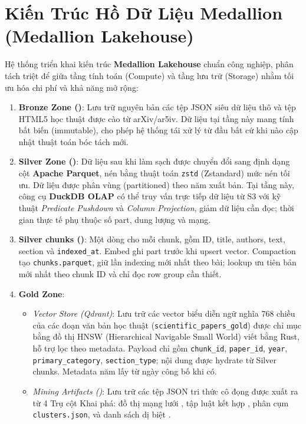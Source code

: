 \section{Kiến Trúc Hồ Dữ Liệu Medallion (Medallion Lakehouse)}

Hệ thống triển khai kiến trúc \textbf{Medallion Lakehouse} chuẩn công nghiệp, phân tách triệt để giữa tầng tính toán (Compute) và tầng lưu trữ (Storage) nhằm tối ưu hóa chi phí và khả năng mở rộng:

\begin{enumerate}[label=\textbf{\arabic*.}]
  \item \textbf{Bronze Zone ()}:
    Lưu trữ nguyên bản các tệp JSON siêu dữ liệu thô và tệp HTML5 học thuật được cào từ arXiv/ar5iv. Dữ liệu tại tầng này mang tính bất biến (immutable), cho phép hệ thống tái xử lý từ đầu bất cứ khi nào cập nhật thuật toán bóc tách mới.
  \item \textbf{Silver Zone ()}:
    Dữ liệu sau khi làm sạch được chuyển đổi sang định dạng cột \textbf{Apache Parquet}, nén bằng thuật toán \texttt{zstd} (Zstandard) mức nén tối ưu. Dữ liệu được phân vùng (partitioned) theo năm xuất bản. Tại tầng này, công cụ \textbf{DuckDB OLAP} có thể truy vấn trực tiếp dữ liệu từ S3 với kỹ thuật \textit{Predicate Pushdown} và \textit{Column Projection}, giảm dữ liệu cần đọc; thời gian thực tế phụ thuộc số part, dung lượng và mạng.
  \item \textbf{Silver chunks ()}: Một dòng cho mỗi chunk, gồm ID, title, authors, text, section và \texttt{indexed\_at}. Embed ghi part trước khi upsert vector. Compaction tạo \texttt{chunks.parquet}, giữ lần indexing mới nhất theo bài; lookup ưu tiên bản mới nhất theo chunk ID và chỉ đọc row group cần thiết.
  \item \textbf{Gold Zone}:
    \begin{itemize}
      \item \textit{Vector Store (Qdrant)}: Lưu trữ các vector biểu diễn ngữ nghĩa 768 chiều của các đoạn văn bản học thuật (\texttt{scientific\_papers\_gold}) được chỉ mục bằng đồ thị HNSW (Hierarchical Navigable Small World) viết bằng Rust, hỗ trợ lọc theo metadata. Payload chỉ gồm \texttt{chunk\_id}, \texttt{paper\_id}, \texttt{year}, \texttt{primary\_category}, \texttt{section\_type}; nội dung được hydrate từ Silver chunks. Metadata năm lấy từ ngày công bố khi có.
      \item \textit{Mining Artifacts ()}: Lưu trữ các tệp JSON tri thức cô đọng được xuất ra từ 4 Trụ cột Khai phá: đồ thị mạng lưới , tập luật kết hợp , phân cụm \texttt{clusters.json}, và danh sách dị biệt .
    \end{itemize}
\end{enumerate}

